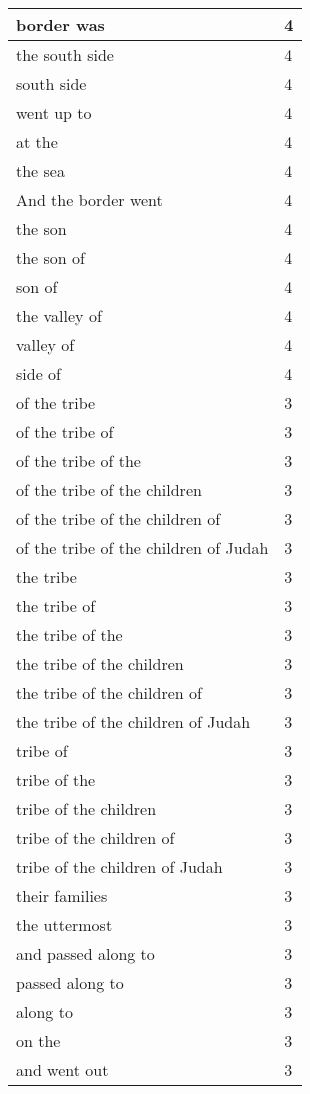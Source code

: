 \begin{center}
\begin{longtable}{|p{3.0in}|p{0.5in}|}
border was & 4\\ \hline 
the south side & 4\\ \hline 
south side & 4\\ \hline 
went up to & 4\\ \hline 
at the & 4\\ \hline 
the sea & 4\\ \hline 
And the border went & 4\\ \hline 
the son & 4\\ \hline 
the son of & 4\\ \hline 
son of & 4\\ \hline 
the valley of & 4\\ \hline 
valley of & 4\\ \hline 
side of & 4\\ \hline 
of the tribe & 3\\ \hline 
of the tribe of & 3\\ \hline 
of the tribe of the & 3\\ \hline 
of the tribe of the children & 3\\ \hline 
of the tribe of the children of & 3\\ \hline 
of the tribe of the children of Judah & 3\\ \hline 
the tribe & 3\\ \hline 
the tribe of & 3\\ \hline 
the tribe of the & 3\\ \hline 
the tribe of the children & 3\\ \hline 
the tribe of the children of & 3\\ \hline 
the tribe of the children of Judah & 3\\ \hline 
tribe of & 3\\ \hline 
tribe of the & 3\\ \hline 
tribe of the children & 3\\ \hline 
tribe of the children of & 3\\ \hline 
tribe of the children of Judah & 3\\ \hline 
their families & 3\\ \hline 
the uttermost & 3\\ \hline 
and passed along to & 3\\ \hline 
passed along to & 3\\ \hline 
along to & 3\\ \hline 
on the & 3\\ \hline 
and went out & 3\\ \hline 

\end{longtable}
\end{center}
